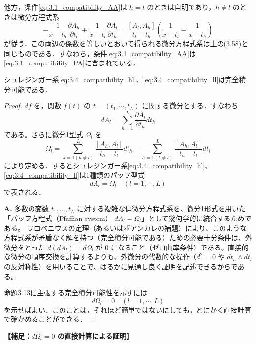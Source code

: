 他方，条件\eqref{eq:3.1_compatibility_AA}は $h=l$ のときは自明であり，$h \neq l$ のときは微分方程式系
\[
  -\frac{1}{x-t_h} \frac{\partial A_h}{\partial t_l} + \frac{1}{x-t_l} \frac{\partial A_l}{\partial t_h} = \frac{[A_l, A_h]}{t_l - t_h} \left( \frac{1}{x-t_l} - \frac{1}{x-t_h} \right)
\]
が従う．この両辺の係数を等しいとおいて得られる微分方程式系は上の(3.58)と同じものである．すなわち，条件\eqref{eq:3.1_compatibility_AA}は\eqref{eq:3.1_compatibility_PA}に含まれている．

\begin{proposition}\label{prop:3.4_schleginger_compatibility}
シュレジンガー系\eqref{eq:3.4_compatibility_hl}、\eqref{eq:3.4_compatibility_ll}は完全積分可能である．
\end{proposition}

\begin{proof}
$df$ を，関数 $f(t)$ の $t=(t_1,\cdots,t_L)$ に関する微分とする．すなわち
\[
  dA_l = \sum_{h=1}^L \frac{\partial A_l}{\partial t_h} dt_h
\]
である。さらに微分1型式 $\Omega_l$ を
\[
  \Omega_l = \sum_{h=1(h \neq l)}^L \frac{[A_h, A_l]}{t_h - t_l} dt_h - \sum_{h=1(h \neq l)}^L \frac{[A_h, A_l]}{t_h - t_l} dt_l
\]
により定める．するとシュレジンガー系\eqref{eq:3.4_compatibility_hl}、\eqref{eq:3.4_compatibility_ll}は1種類のパッフ型式
\[
  dA_l = \Omega_l \quad (l=1,\cdots,L)
\]
で表される．

\begin{Q}[シュレジンガー系の完全積分可能性を示すために、なぜ微分形式 $\Omega_l$ を導入し $d\Omega_l = 0$ を確かめるというアプローチをとるのか？]%
\textbf{A.} 多数の変数 $t_1, \dots, t_L$ に対する複雑な偏微分方程式系を、微分1形式を用いた「パッフ方程式（Pfaffian system） $dA_l = \Omega_l$」として幾何学的に統合するためである。
フロベニウスの定理（あるいはポアンカレの補題）により、このような方程式系が矛盾なく解を持つ（完全積分可能である）ための必要十分条件は、外微分をとった $d(dA_l) = d\Omega_l$ が $0$ になること（ゼロ曲率条件）である。直接的な微分の順序交換を計算するよりも、外微分の代数的な操作（$d^2 = 0$ や $dt_h \wedge dt_l$ の反対称性）を用いることで、はるかに見通し良く証明を記述できるからである。
\end{Q}

命題3.13に主張する完全積分可能性を示すには
\[
  d\Omega_l = 0 \quad (l=1,\cdots,L)
\]
を示せばよい．このことは，それほど簡単ではないにしても，とにかく直接計算で確かめることができる．
\end{proof}

\vspace{1em}
\noindent
\textbf{【補足：$d\Omega_l = 0$ の直接計算による証明】}

